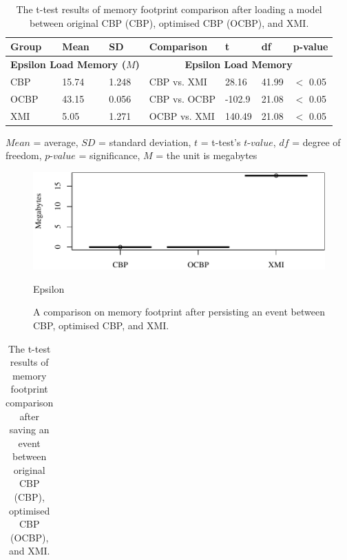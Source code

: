 \documentclass{llncs}
\begin{document}
{\begin{table}[h]
\footnotesize
\centering
\caption{The t-test results of memory footprint comparison after loading a model between original CBP (CBP), optimised CBP (OCBP), and XMI.}
\label{table:ttest_results_load_memory}
\begin{tabular}
{|p{}p{}p{}|p{}p{}p{}p{}|}
\hline 

Group & Mean & SD & Comparison & t  & df & p-value \\
\hline 

\multicolumn{3}{|c|}{\textbf{Epsilon Load Memory ($M$)}} & \multicolumn{4}{c|}{\textbf{Epsilon Load Memory}} \\
CBP &15.74    & 1.248 &  CBP vs. XMI & 28.16   &  41.99 & $<$ 0.05 \\
OCBP & 43.15   & 0.056 & CBP vs. OCBP & -102.9 &21.08 & $<$ 0.05 \\  
XMI & 5.05   & 1.271 & OCBP vs. XMI & 140.49  & 21.08  & $<$ 0.05 \\ 
\hline 

\end{tabular}
\justify
$Mean$ = average, $SD$ = standard deviation, $t$ = t-test's $t$-$value$, $df$ = degree of freedom, $p$-$value$ = significance, $M$ = the unit is megabytes
\end{table}

\vspace{-10pt}
\begin{figure}
\centering
\includegraphics[width=\linewidth]{images/save_memory_epsilon}
\caption{Epsilon}
\label{fig:save_memory_epsilon}
\caption{A comparison on memory footprint after persisting an event between CBP, optimised CBP, and XMI.}
\label{fig:savememory}
\end{figure}

\begin{table}[t]
\footnotesize
\centering
\caption{The t-test results of memory footprint comparison after saving an event between original CBP (CBP), optimised CBP (OCBP), and XMI.}
\label{table:ttest_results_save_memory}
\begin{tabular}
{|p{}p{}p{}|p{}p{}p{}p{}|}
\hline 


\end{tabular}
\end{table}}
\end{document}
